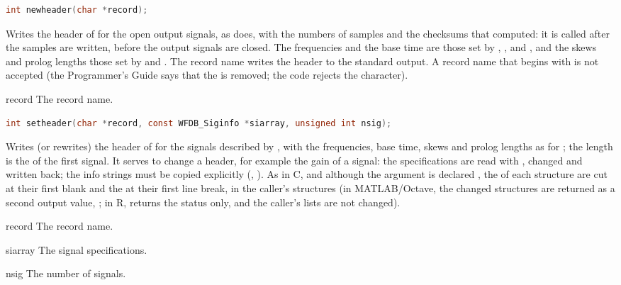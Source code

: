 \begin{lstlisting}[language=C,style=signature]
int newheader(char *record);
\end{lstlisting}
Writes the header of  for the open output signals, as
 does, with the numbers of samples and the checksums that
 computed: it is called after the samples are written, before the
output signals are closed. The frequencies and the base time are those set
by , ,  and
, and the skews and prolog lengths those set by
 and . The record name \code{-} writes
the header to the standard output. A record name that begins with
\code{+} is not accepted (the Programmer's Guide says that the \code{+} is
removed; the code rejects the character).
\begin{params}
\item[record] The record name.
\end{params}

\begin{lstlisting}[language=C,style=signature]
int setheader(char *record, const WFDB_Siginfo *siarray, unsigned int nsig);
\end{lstlisting}
Writes (or rewrites) the header of  for the  signals
described by , with the frequencies, base time, skews and prolog
lengths as for ; the length is the  of the first
signal. It serves to change a header, for example the gain of a signal: the
specifications are read with , changed
and written back; the info strings must be copied explicitly
(, ). As in C, and although the argument is
declared , the  of each structure are cut at their
first blank and the  at their first line break, in the caller's
structures (in MATLAB/Octave, the changed structures are returned as a second
output value, \code{[stat, si]}; in R,  returns the status
only, and the caller's lists are not changed).
\begin{params}
\item[record] The record name.
\item[siarray] The signal specifications.
\item[nsig] The number of signals.
\end{params}

